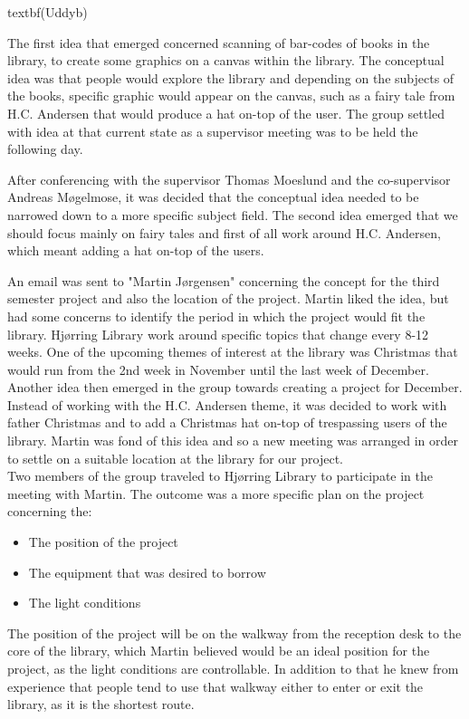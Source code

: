 textbf{(Uddyb)}

The first idea that emerged concerned scanning of bar-codes of books in the library, to create some graphics on a canvas within the library. The conceptual idea was that people would explore the library and depending on the subjects of the books, specific graphic would appear on the canvas, such as a fairy tale from H.C. Andersen that would produce a hat on-top of the user. The group settled with idea at that current state as a supervisor meeting was to be held the following day.

After conferencing with the supervisor Thomas Moeslund and the co-supervisor Andreas Møgelmose, it was decided that the conceptual idea needed to be narrowed down to a more specific subject field. The second idea emerged that we should focus mainly on fairy tales and first of all work around H.C. Andersen, which meant adding a hat on-top of the users.

An email was sent to "Martin Jørgensen" concerning the concept for the third semester project and also the location of the project. Martin liked the idea, but had some concerns to identify the period in which the project would fit the library. Hjørring Library work around specific topics that change every 8-12 weeks. One of the upcoming themes of interest at the library was Christmas that would run from the 2nd week in November until the last week of December. Another idea then emerged in the group towards creating a project for December. Instead of working with the H.C. Andersen theme, it was decided to work with father Christmas and to add a Christmas hat on-top of trespassing users of the library. Martin was fond of this idea and so a new meeting was arranged in order to settle on a suitable location at the library for our project.\\
Two members of the group traveled to Hjørring Library to participate in the meeting with Martin. The outcome was a more specific plan on the project concerning the:
\begin{itemize}
\item The position of the project
\item The equipment that was desired to borrow
\item The light conditions
\end{itemize}
The position of the project will be on the walkway from the reception desk to the core of the library, which Martin believed would be an ideal position for the project, as the light conditions are controllable. In addition to that he knew from experience that people tend to use that walkway either to enter or exit the library, as it is the shortest route.


